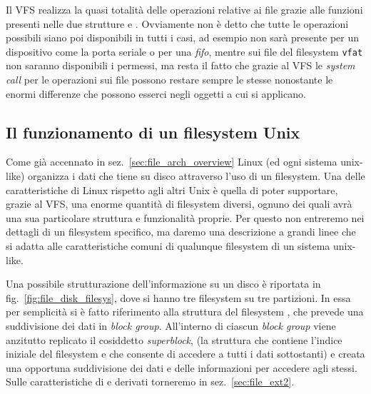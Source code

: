 Il VFS realizza la quasi totalità delle operazioni relative ai file grazie
alle funzioni presenti nelle due strutture  e
.  Ovviamente non è detto che tutte le operazioni
possibili siano poi disponibili in tutti i casi, ad esempio  non
sarà presente per un dispositivo come la porta seriale o per una
\textit{fifo}, mentre sui file del filesystem \texttt{vfat} non saranno
disponibili i permessi, ma resta il fatto che grazie al VFS le \textit{system
  call} per le operazioni sui file possono restare sempre le stesse nonostante
le enormi differenze che possono esserci negli oggetti a cui si applicano.
 





\subsection{Il funzionamento di un filesystem Unix}
\label{sec:file_filesystem}

Come già accennato in sez.~\ref{sec:file_arch_overview} Linux (ed ogni sistema
unix-like) organizza i dati che tiene su disco attraverso l'uso di un
filesystem. Una delle caratteristiche di Linux rispetto agli altri Unix è
quella di poter supportare, grazie al VFS, una enorme quantità di filesystem
diversi, ognuno dei quali avrà una sua particolare struttura e funzionalità
proprie.  Per questo non entreremo nei dettagli di un filesystem specifico, ma
daremo una descrizione a grandi linee che si adatta alle caratteristiche
comuni di qualunque filesystem di un sistema unix-like.


Una possibile strutturazione dell'informazione su un disco è riportata in
fig.~\ref{fig:file_disk_filesys}, dove si hanno tre filesystem su tre
partizioni. In essa per semplicità si è fatto riferimento alla struttura del
filesystem , che prevede una suddivisione dei dati in \textit{block
  group}.  All'interno di ciascun \textit{block group} viene anzitutto
replicato il cosiddetto \textit{superblock}, (la struttura che contiene
l'indice iniziale del filesystem e che consente di accedere a tutti i dati
sottostanti) e creata una opportuna suddivisione dei dati e delle informazioni
per accedere agli stessi.  Sulle caratteristiche di  e derivati
torneremo in sez.~\ref{sec:file_ext2}.

